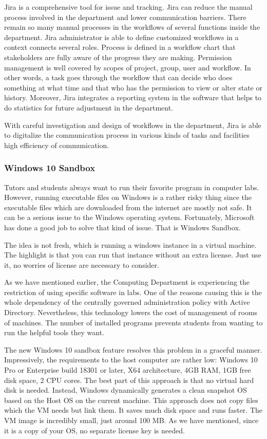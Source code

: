 Jira is a comprehensive tool for issue and tracking. Jira can reduce the manual process involved in the department and lower communication barriers. There remain so many manual processes in the workflows of several functions inside the department. Jira administrator is able to define customized workflows in a context connects several roles. Process is defined in a workflow chart that stakeholders are fully aware of the progress they are making. Permission management is well covered by scopes of project, group, user and workflow. In other words, a task goes through the workflow that can decide who does something at what time and that who has the permission to view or alter state or history. Moreover, Jira integrates a reporting system in the software that helps to do statistics for future adjustment in the department.

With careful investigation and design of workflows in the department, Jira is able to digitalize the communication process in various kinds of tasks and facilities high efficiency of communication.

\subsubsection{Windows 10 Sandbox}

Tutors and students always want to run their favorite program in computer labs. However, running executable files on Windows is a rather risky thing since the executable files which are downloaded from the internet are mostly not safe. It can be a serious issue to the Windows operating system. Fortunately, Microsoft has done a good job to solve that kind of issue. That is Windows Sandbox.

The idea is not fresh, which is running a windows instance in a virtual machine. The highlight is that you can run that instance without an extra license. Just use it, no worries of license are necessary to consider. 

As we have mentioned earlier, the Computing Department is experiencing the restriction of using specific software in labs. One of the reasons causing this is the whole dependency of the centrally governed administration policy with Active Directory. Nevertheless, this technology lowers the cost of management of rooms of machines. The number of installed programs prevents students from wanting to run the helpful tools they want. 

The new Windows 10 sandbox feature resolves this problem in a graceful manner. Impressively, the requirements to the host computer are rather low: Windows 10 Pro or Enterprise build 18301 or later, X64 architecture, 4GB RAM, 1GB free disk space, 2 CPU cores. The best part of this approach is that no virtual hard disk is needed. Instead, Windows dynamically generates a clean snapshot OS based on the Host OS on the current machine. This approach does not copy files which the VM needs but link them. It saves much disk space and runs faster. The VM image is incredibly small, just around 100 MB. As we have mentioned, since it is a copy of your OS, no separate license key is needed.  

